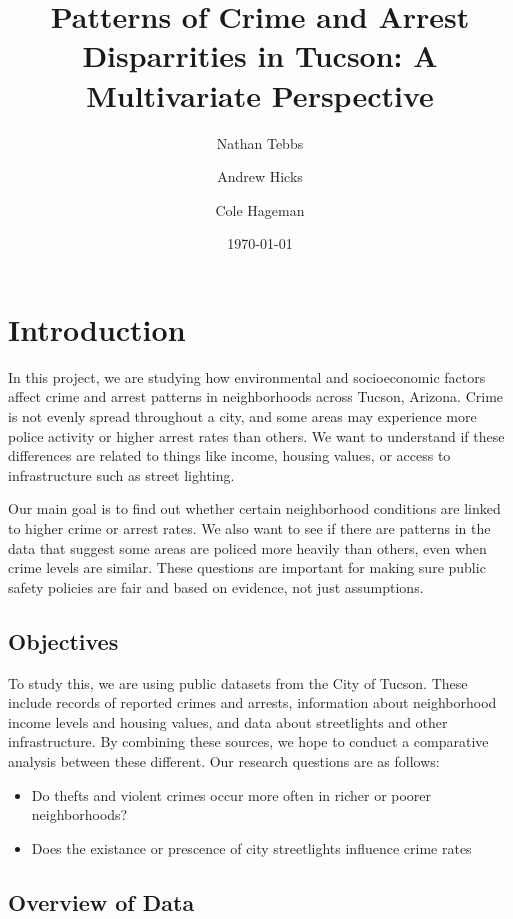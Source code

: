 \documentclass{report}
\title{\textbf{Patterns of Crime and Arrest Disparrities in Tucson: A Multivariate Perspective}}
\author{Nathan Tebbs \and Andrew Hicks \and Cole Hageman}
\date{\today}
\begin{document}
\maketitle
\tableofcontents


	\chapter{Introduction}
	
	In this project, we are studying how environmental and socioeconomic factors affect crime and arrest patterns in neighborhoods across Tucson, Arizona. Crime is not evenly spread throughout a city, and some areas may experience more police activity or higher arrest rates than others. We want to understand if these differences are related to things like income, housing values, or access to infrastructure such as street lighting.
	
	Our main goal is to find out whether certain neighborhood conditions are linked to higher crime or arrest rates. We also want to see if there are patterns in the data that suggest some areas are policed more heavily than others, even when crime levels are similar. These questions are important for making sure public safety policies are fair and based on evidence, not just assumptions.
	
	\newpage
	\section{Objectives}
	
	To study this, we are using public datasets from the City of Tucson. These include records of reported crimes and arrests, information about neighborhood income levels and housing values, and data about streetlights and other infrastructure. By combining these sources, we hope to conduct a comparative analysis between these different. Our research questions are as follows:
	
	\begin{itemize}
		\item Do thefts and violent crimes occur more often in richer or poorer neighborhoods?
		\item Does the existance or prescence of city streetlights influence crime rates
	\end{itemize}
	
	\section{Overview of Data}
	
\end{document}
